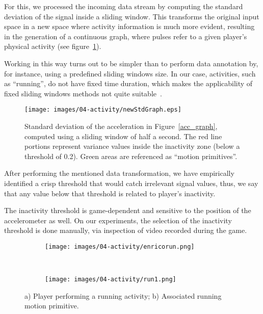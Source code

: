 For this, we processed the incoming data stream by computing the standard deviation of the signal inside a sliding window. This transforms the original input space in a new space where activity information is much more evident, resulting in the generation of a continuous graph, where pulses refer to a given player's physical activity (see figure~\ref{fig:std_graph}).

Working in this way turns out to be simpler than to perform data annotation by, for instance, using a predefined sliding windows size. In our case, activities, such as ``running'', do not have fixed time duration, which makes the applicability of fixed sliding windows methods not quite suitable~\cite{noor_adaptive_2016}.

\begin{figure}[H]
      \centering
      \texttt{[image: images/04-activity/newStdGraph.eps]}
      \caption{Standard deviation of the acceleration in Figure~\ref{acc_graph}, computed using a sliding window of half a second. The red line portions represent variance values inside the inactivity zone (below a threshold of 0.2). Green areas are referenced as ``motion primitives''.}\label{fig:std_graph}
\end{figure}

After performing the mentioned data transformation, we have empirically identified a crisp threshold that would catch irrelevant signal values, thus, we say that any value below that threshold is related to player's inactivity.

The inactivity threshold is game-dependent and sensitive to the position of the accelerometer as well. On our experiments, the selection of the inactivity threshold is done manually, via inspection of video recorded during the game.

\begin{figure}[H]
    \centering
    \begin{subfigure}[b]{0.3\textwidth}
     	\centering
        \texttt{[image: images/04-activity/enricorun.png]}
        \caption{}
	\end{subfigure}
	~
    \begin{subfigure}[b]{0.3\textwidth}
     	\centering
        \texttt{[image: images/04-activity/run1.png]}
        \caption{}
	\end{subfigure}
	\caption{a) Player performing a running activity;  b) Associated running motion primitive.}\label{fig:running}
\end{figure}

